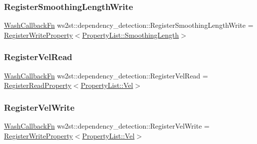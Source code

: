 \subsubsection{\texorpdfstring{Register\+Smoothing\+Length\+Write}{RegisterSmoothingLengthWrite}}
{\footnotesize\ttfamily \mbox{\hyperlink{namespacews2st_a682dfda40d8282c7e579a7b826a7d861}{Wash\+Callback\+Fn}} ws2st\+::dependency\+\_\+detection\+::\+Register\+Smoothing\+Length\+Write = \mbox{\hyperlink{namespacews2st_1_1dependency__detection_a37100c3e1b7e8038aff533d343905484}{Register\+Write\+Property}}$<$\mbox{\hyperlink{namespacews2st_1_1dependency__detection_abcddd986f080a9e5c494edfad3c3faf7a209c4a2539e3220aadbf61e605f9bfdc}{Property\+List\+::\+Smoothing\+Length}}$>$}

\mbox{\label{namespacews2st_1_1dependency__detection_aed25baa7764a0238de47cd7472b75442}} 
\subsubsection{\texorpdfstring{Register\+Vel\+Read}{RegisterVelRead}}
{\footnotesize\ttfamily \mbox{\hyperlink{namespacews2st_a682dfda40d8282c7e579a7b826a7d861}{Wash\+Callback\+Fn}} ws2st\+::dependency\+\_\+detection\+::\+Register\+Vel\+Read = \mbox{\hyperlink{namespacews2st_1_1dependency__detection_aa071e67a31629c2fff6e3d16a9eed42d}{Register\+Read\+Property}}$<$\mbox{\hyperlink{namespacews2st_1_1dependency__detection_abcddd986f080a9e5c494edfad3c3faf7aec930ca2dec8aa0b05a106add08d538e}{Property\+List\+::\+Vel}}$>$}

\mbox{\label{namespacews2st_1_1dependency__detection_a3ffb67860163115d27fe818c7507a0cd}} 
\subsubsection{\texorpdfstring{Register\+Vel\+Write}{RegisterVelWrite}}
{\footnotesize\ttfamily \mbox{\hyperlink{namespacews2st_a682dfda40d8282c7e579a7b826a7d861}{Wash\+Callback\+Fn}} ws2st\+::dependency\+\_\+detection\+::\+Register\+Vel\+Write = \mbox{\hyperlink{namespacews2st_1_1dependency__detection_a37100c3e1b7e8038aff533d343905484}{Register\+Write\+Property}}$<$\mbox{\hyperlink{namespacews2st_1_1dependency__detection_abcddd986f080a9e5c494edfad3c3faf7aec930ca2dec8aa0b05a106add08d538e}{Property\+List\+::\+Vel}}$>$}

